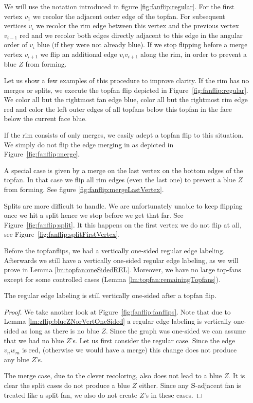   We will use the notation introduced in figure \ref{fig:fanflip:regular}.
  For the first vertex $v_1$ we recolor the adjacent outer edge of the topfan. For subsequent vertices $v_i$ we recolor the rim edge between this vertex and the previous vertex $v_{i-1}$ red and we recolor both edges directly adjacent to this edge in the angular order of $v_i$ blue (if they were not already blue).
  If we stop flipping before a merge vertex $v_{i+1}$ we flip an additional edge $v_i v_{i+1}$ along the rim, in order to prevent a blue $Z$ from forming.

  Let us show a few examples of this procedure to improve clarity.
  If the rim has no merges or splits, we execute the topfan flip depicted in Figure~\ref{fig:fanflip:regular}.
  We color all but the rightmost fan edge blue, color all but the rightmost rim edge red and color the left outer edges of all topfans below this topfan in the face below the current face blue.

  If the rim consists of only merges, we easily adept a topfan flip to this situation. We simply do not flip the edge merging in as depicted in Figure~\ref{fig:fanflip:merge}.

  A special case is given by a merge on the last vertex on the bottom edges of the topfan. In that case we flip all rim edges (even the last one) to prevent a blue $Z$ from forming. See figure \ref{fig:fanflip:mergeLastVertex}.

  Splits are more difficult to handle. We are unfortunately unable to keep flipping once we hit a split hence we stop before we get that far. See Figure~\ref{fig:fanflip:split}. It this happens on the first vertex we do not flip at all, see Figure~\ref{fig:fanflip:splitFirstVertex}.

  Before the topfanflips, we had a vertically one-sided regular edge labeling. Afterwards we still have a vertically one-sided regular edge labeling, as we will prove in Lemma \ref{lm:topfan:oneSidedREL}. Moreover, we have no large top-fans except for some controlled cases (Lemma \ref{lm:topfan:remainingTopfans}).

  \begin{lemma}
    \label{lm:topfan:oneSidedREL}
    The regular edge labeling is still vertically one-sided after a topfan flip.
  \end{lemma}
  \begin{proof}
    We take another look at Figure~\ref{fig:fanflip:fanflips}. Note that due to Lemma \ref{lm:zflip:blueZNorVertOneSided} a regular edge labeling is vertically one-sided as long as there is no blue $Z$.  Since the graph was one-sided we can assume that we had no blue $Z$'s.
    Let us first consider the regular case. Since the edge  $v_n w_m$ is red, (otherwise we would have a merge) this change does not produce any blue $Z$'s.

    The merge case, due to the clever recoloring, also does not lead to a blue $Z$.
    It is clear the split cases do not produce a blue $Z$ either.
    Since any $\mathrm{S}$-adjacent fan is treated like a split fan, we also do not create $Z$'s in these cases.
  \end{proof}
\pagebreak[2]

